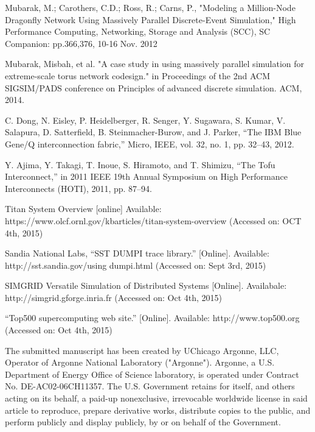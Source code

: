 \documentclass[conference]{IEEEtran}
\begin{document}
\begin{thebibliography}{10}
Mubarak, M.; Carothers, C.D.; Ross, R.; Carns, P.,
\newblock "Modeling a Million-Node Dragonfly Network Using Massively Parallel Discrete-Event Simulation," 
\newblock High Performance Computing, Networking, Storage and Analysis (SCC), 
 SC Companion: 
\newblock pp.366,376, 10-16 Nov. 2012

Mubarak, Misbah, et al.
\newblock "A case study in using massively parallel simulation for extreme-scale torus network codesign." 
\newblock in Proceedings of the 2nd ACM SIGSIM/PADS conference on Principles of advanced discrete simulation. 
\newblock ACM, 2014.

C. Dong, N. Eisley, P. Heidelberger, R. Senger, Y. Sugawara, S. Kumar, V. Salapura, D. Satterfield, B. Steinmacher-Burow, and J. Parker, 
\newblock “The IBM Blue Gene/Q interconnection fabric,” 
\newblock Micro, IEEE, vol. 32, no. 1, pp. 32–43, 2012.

Y. Ajima, Y. Takagi, T. Inoue, S. Hiramoto, and T. Shimizu, 
\newblock “The Tofu Interconnect,” 
\newblock in 2011 IEEE 19th Annual Symposium on High Performance Interconnects (HOTI), 2011, pp. 87–94.

Titan System Overview [online]
\newblock Available: https://www.olcf.ornl.gov/kbarticles/titan-system-overview
\newblock (Accessed on: OCT 4th, 2015)


Sandia National Labs, “SST DUMPI trace library.” [Online].
\newblock Available: http://sst.sandia.gov/using dumpi.html 
\newblock (Accessed on: Sept 3rd, 2015)

SIMGRID Versatile Simulation of Distributed Systems [Online].
\newblock Availabale: http://simgrid.gforge.inria.fr
\newblock (Accessed on: Oct 4th, 2015)

“Top500 supercomputing web site.” [Online]. 
\newblock Available: http://www.top500.org
\newblock (Accessed on: Oct 4th, 2015)


\end{thebibliography}


\vspace{5\baselineskip}
The submitted manuscript has been created by UChicago Argonne, LLC, Operator of Argonne National Laboratory ("Argonne").  Argonne, a U.S. Department of Energy Office of Science laboratory, is operated under Contract No. DE-AC02-06CH11357.  The U.S. Government retains for itself, and others acting on its behalf, a paid-up nonexclusive, irrevocable worldwide license in said article to reproduce, prepare derivative works, distribute copies to the public, and perform publicly and display publicly, by or on behalf of the Government.
\end{document}
